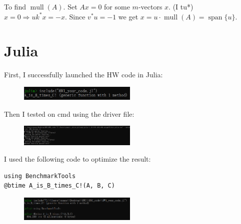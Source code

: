 \documentclass{article}
\begin{document}
To find $\operatorname{mull}(A)$. Set $A x=0$ for some $m$-vectors $x$. (I tu*) $x=0 \Rightarrow u k^* x=-x$. Since $v^* u=-1$ we get $x=u \cdot \operatorname{mull}(A)=\operatorname{span}\{u\}$.
\section{Julia}
First, I successfully launched the HW code in Julia:
\begin{figure}[H]
  \centering
  \includegraphics[width=0.5\textwidth]{Photos/1.png}
  \label{fig:image_label}
\end{figure}
Then I tested on cmd using the driver file:
\begin{figure}[H]
  \centering
  \includegraphics[width=0.5\textwidth]{Photos/2.png}
  \label{fig:image_label}
\end{figure}
I used the following code to optimize the result:
\begin{verbatim}
using BenchmarkTools
@btime A_is_B_times_C!(A, B, C)
\end{verbatim}
\begin{figure}[H]
  \centering
  \includegraphics[width=0.5\textwidth]{Photos/3.png}
  \label{fig:image_label}
\end{figure}
\end{document}
